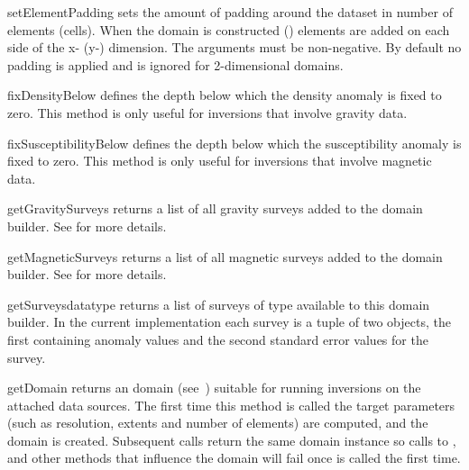 \begin{methoddesc}[DomainBuilder]{setElementPadding}{%
%
}
sets the amount of padding around the dataset in number of elements (cells).
When the domain is constructed  () elements are
added on each side of the x- (y-) dimension. The arguments must be non-negative.
By default no padding is applied and  is ignored for 2-dimensional
domains.
\end{methoddesc}

\begin{methoddesc}[DomainBuilder]{fixDensityBelow}{%
}
defines the depth below which the density anomaly is fixed to zero.
This method is only useful for inversions that involve gravity data.
\end{methoddesc}

\begin{methoddesc}[DomainBuilder]{fixSusceptibilityBelow}{%
}
defines the depth below which the susceptibility anomaly is fixed to zero.
This method is only useful for inversions that involve magnetic data.
\end{methoddesc}

\begin{methoddesc}[DomainBuilder]{getGravitySurveys}{}
returns a list of all gravity surveys added to the domain builder. See
 for more details.
\end{methoddesc}

\begin{methoddesc}[DomainBuilder]{getMagneticSurveys}{}
returns a list of all magnetic surveys added to the domain builder. See
 for more details.
\end{methoddesc}

\begin{methoddesc}[DomainBuilder]{getSurveys}{datatype}
returns a list of surveys of type  available to this domain
builder. In the current implementation each survey is a tuple of two \Data
objects, the first containing anomaly values and the second standard error
values for the survey.
\end{methoddesc}

\begin{methoddesc}[DomainBuilder]{getDomain}{}
returns an \escript domain (see~\cite{ESCRIPT}) suitable for running inversions
on the attached data sources.
The first time this method is called the target parameters (such as resolution,
extents and number of elements) are computed, and the domain is created.
Subsequent calls return the same domain instance so calls to
,  and other methods that influence
the domain will fail once  is called the first time.
\end{methoddesc}

